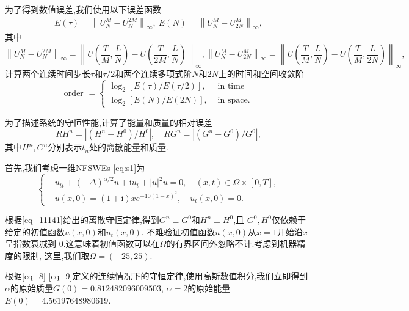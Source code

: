 为了得到数值误差,我们使用以下误差函数
\begin{align}\label{eq_103}
E(\tau)=\left\|U_{N}^{M}-U_{N}^{2 M}\right\|_{\infty},~E(N)=\left\|U_{N}^{M}-U_{2 N}^{M}\right\|_{\infty},
\end{align}
其中
$$\left\|U_{N}^{M}-U_{N}^{2 M}\right\|_{\infty}=\left\|U\left(\frac{T}{M}, \frac{L}{N}\right)-U\left(\frac{T}{2 M}, \frac{L}{N}\right)\right\|_{\infty},\left\|U_{N}^{M}-U_{2 N}^{M}\right\|_{\infty}=\left\|U\left(\frac{T}{M}, \frac{L}{N}\right)-U\left(\frac{T}{M}, \frac{L}{2 N}\right)\right\|_{\infty},$$
计算两个连续时间步长$\tau$和$\tau/2$和两个连续多项式阶$N$和$2N$上的时间和空间收敛阶
\begin{equation}
\text { order }= \left\{
\begin{aligned}
\log _{2}[E(\tau) / E(\tau / 2)], & \text { in time } \\
\log _{2}[E(N) / E(2 N)], & \text { in space. }
\end{aligned}\right.\label{eq_104}
\end{equation}

为了描述系统的守恒性能,计算了能量和质量的相对误差
\begin{equation}\label{eq_105}
R H^{n}=\left|\left(H^{n}-H^{0}\right) / H^{0}\right|, \quad R G^{n}=\left|\left(G^{n}-G^{0}\right) / G^{0}\right|,
\end{equation}
其中$H^{n}, G^{n}$分别表示$t_n$处的离散能量和质量.

\begin{example}\label{ex:2}
	首先,我们考虑一维NFSWEs \eqref{eq:s1}为
\begin{equation}
	\left\{
\begin{aligned}
&u_{t t}+(-\Delta)^{\alpha / 2} u+\mathrm{i}u_t+|u|^2 u=0, \quad (x,t)\in  \Omega\times[0, T],\\
&u(x, 0)=(1+\mathrm{i}) x e^{-10(1-x)^2},\quad u_t(x, 0)=0.
\end{aligned}\right.\label{eq_108}
\end{equation}

\end{example}
根据\eqref{eq_11141}给出的离散守恒定律,得到$G^n\equiv G^0$和$H^n\equiv H^0$,且 $G^0, H^0$仅依赖于给定的初值函数$u(x,0)$和$u_t(x, 0)$.
不难验证初值函数$u(x, 0)$从$x=1$开始沿$x$呈指数衰减到 $0 $.这意味着初值函数可以在$\Omega$的有界区间外忽略不计.考虑到机器精度的限制,
这里,我们取$\Omega=(-25,25)$.

根据\eqref{eq_8}-\eqref{eq_9}定义的连续情况下的守恒定律,使用高斯数值积分,我们立即得到$\alpha$的原始质量$G(0)=0.812482096009503$, $\alpha=2$的原始能量$E(0)=4.56197648980619$.

